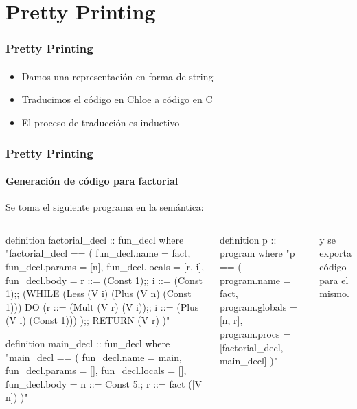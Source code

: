 \section{Pretty Printing}

\begin{frame}
\frametitle{Pretty Printing}
\framesubtitle{}

\begin{itemize}
\item{Damos una representación en forma de string}
\item{Traducimos el código en Chloe a código en C}
\item{El proceso de traducción es inductivo}
\end{itemize}

\end{frame}

\begin{frame}[fragile]
\frametitle{Pretty Printing}
\framesubtitle{Generación de código para factorial}
\Fontvi

Se toma el siguiente programa en la semántica:

\begin{columns}[t]
\begin{semiverbatim}
definition factorial_decl :: fun_decl
  where "factorial_decl ==
    ( fun_decl.name = fact,
      fun_decl.params = [n],
      fun_decl.locals = [r, i],
      fun_decl.body =
        r ::= (Const 1);;
        i ::= (Const 1);;
        (WHILE (Less (V i) (Plus (V n) (Const 1))) DO
          (r ::= (Mult (V r) (V i));;
          i ::= (Plus (V i) (Const 1)))
        );;
        RETURN (V r)
    )"

definition main_decl :: fun_decl
  where "main_decl ==
    ( fun_decl.name = main,
      fun_decl.params = [],
      fun_decl.locals = [],
      fun_decl.body =
        n ::= Const 5;;
        r ::= fact ([V n])
    )"
\end{semiverbatim}
\begin{semiverbatim}
definition p :: program
  where "p ==
    ( program.name = fact,
      program.globals = [n, r],
      program.procs = [factorial_decl, main_decl]
    )"
\end{semiverbatim}

y se exporta código para el mismo.
\end{columns}


\end{frame}


